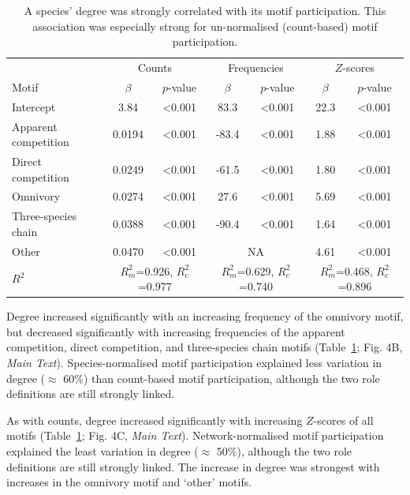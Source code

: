 \documentclass[12pt]{article}
\begin{document}
\begin{spacing}{2.0}
			\begin{table}[hb!]
    			\caption{A species' degree was strongly correlated with its motif participation. This association was especially strong for un-normalised (count-based) motif participation.}
    			\label{tab:motifs_vs_deg}
    			\begin{tabular}{l | c c | c c | c c}
    			& \multicolumn{2}{c|}{Counts} & \multicolumn{2}{c}{Frequencies} & \multicolumn{2}{|c}{$Z$-scores} \\
    			Motif & $\beta$ & $p$-value & $\beta$ & $p$-value & $\beta$ & $p$-value \\
    			\hline
    			Intercept &  3.84  & \textless0.001 & 83.3 & \textless0.001 & 22.3 & \textless0.001\\
    			\hline
    			Apparent competition       &  0.0194  & \textless0.001 & -83.4 & \textless0.001 & 1.88 & \textless0.001 \\
    			Direct competition       &  0.0249  & \textless0.001 & -61.5 & \textless0.001 & 1.80 & \textless0.001\\
    			Omnivory       &  0.0274  & \textless0.001 & 27.6 & \textless0.001 & 5.69 & \textless0.001\\
    			Three-species chain       &  0.0388  & \textless0.001 & -90.4 & \textless0.001 & 1.64 & \textless0.001\\
    			Other    &  0.0470  & \textless0.001 & \multicolumn{2}{c|}{NA} & 4.61 & \textless0.001 \\
    			\hline
    			$R^2$ & \multicolumn{2}{c|}{\tiny{$R^2_m$=0.926, $R^2_c$=0.977}} & \multicolumn{2}{c}{\tiny{$R^2_m$=0.629, $R^2_c$=0.740}} & \multicolumn{2}{|c}{\tiny{$R^2_m$=0.468, $R^2_c$=0.896}} \\
    			\end{tabular}
    			\end{table}


			Degree increased significantly with an increasing frequency of the omnivory motif, but decreased significantly with increasing frequencies of the apparent competition, direct competition, and three-species chain motifs (Table~\ref{tab:motifs_vs_deg}; Fig. 4B, \emph{Main Text}).
			Species-normalised motif participation explained less variation in degree ($\approx$ 60\%) than count-based motif participation, although the two role definitions are still strongly linked.


			As with counts, degree increased significantly with increasing $Z$-scores of all motifs (Table~\ref{tab:motifs_vs_deg}; Fig. 4C, \emph{Main Text}).
			Network-normalised motif participation explained the least variation in degree ($\approx$ 50\%), although the two role definitions are still strongly linked.
			The increase in degree was strongest with increases in the omnivory motif and `other' motifs.



\end{spacing}
\end{document}
